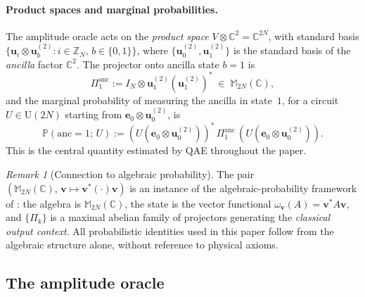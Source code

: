 \documentclass[12pt,a4paper]{article}
\theoremstyle{plain}
\theoremstyle{definition}
\theoremstyle{remark}
\newtheorem{remark}[remark]{Remark}
\begin{document}
\paragraph{Product spaces and marginal probabilities.}
The amplitude oracle acts on the \emph{product space}
$V \otimes \mathbb{C}^2 = \mathbb{C}^{2N}$,
with standard basis
$\{\mathbf{u}_i \otimes \mathbf{u}_b^{(2)} :
i \in \mathbb{Z}_N,\, b \in \{0,1\}\}$,
where $\{\mathbf{u}_0^{(2)}, \mathbf{u}_1^{(2)}\}$ is the standard
basis of the \emph{ancilla} factor $\mathbb{C}^2$.
The projector onto ancilla state $b=1$ is
\begin{equation}
  \Pi_1^{\mathrm{anc}}
  := I_N \otimes \mathbf{u}_1^{(2)}(\mathbf{u}_1^{(2)})^*
  \;\in\; \mathbb{M}_{2N}(\mathbb{C}),
  \label{eq:ancilla_projector}
\end{equation}
and the marginal probability of measuring the ancilla in state~$1$,
for a circuit $U \in \mathrm{U}(2N)$ starting from
$\mathbf{e}_0 \otimes \mathbf{u}_0^{(2)}$, is
\begin{equation}
  \mathbb{P}(\mathrm{anc}=1;\, U)
  := (U(\mathbf{e}_0\otimes\mathbf{u}_0^{(2)}))^*\,
     \Pi_1^{\mathrm{anc}}\,
     (U(\mathbf{e}_0\otimes\mathbf{u}_0^{(2)})).
  \label{eq:marginal_linalg}
\end{equation}
This is the central quantity estimated by QAE throughout the paper.

\begin{remark}[Connection to algebraic probability]
\label{rem:alg_prob}
The pair $(\mathbb{M}_{2N}(\mathbb{C}),\,\mathbf{v}\mapsto\mathbf{v}^*(\cdot)\mathbf{v})$
is an instance of the algebraic-probability framework of
\cite{FalcoMatthies2026}: the algebra is $\mathbb{M}_{2N}(\mathbb{C})$,
the state is the vector functional $\omega_\mathbf{v}(A)=\mathbf{v}^*A\mathbf{v}$,
and $\{\Pi_k\}$ is a maximal abelian family of projectors generating
the \emph{classical output context}.
All probabilistic identities used in this paper follow from the
algebraic structure alone, without reference to physical axioms.
\end{remark}

\subsection{The amplitude oracle}
\label{subsec:oracle}
\end{document}
